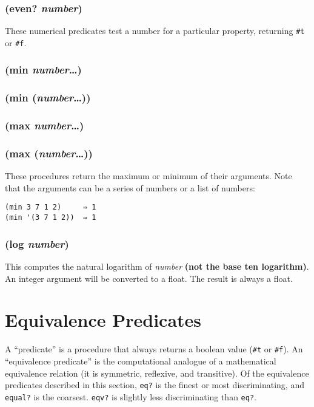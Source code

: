 \documentclass{article}
\begin{document}
\subsubsection{(even? \emph{number})}

These numerical predicates test a number for a particular property, returning \verb|#t| or
\verb|#f|.

\subsubsection{(min \emph{number}\ldots{})}

\subsubsection{(min (\emph{number}\ldots{}))}

\subsubsection{(max \emph{number}\ldots{})}

\subsubsection{(max (\emph{number}\ldots{}))}

These procedures return the maximum or minimum of their arguments. Note that the arguments can
be a series of numbers or a list of numbers:

\begin{verbatim}
(min 3 7 1 2)     ⇒ 1
(min '(3 7 1 2))  ⇒ 1
\end{verbatim}

\subsubsection{(log \emph{number})}

This computes the natural logarithm of \emph{number} \textbf{(not the base ten logarithm)}. An
integer argument will be converted to a float. The result is always a float.

\section{Equivalence Predicates}\label{sec:equivalence-predicates}

A ``predicate'' is a procedure that always returns a boolean value (\verb|#t| or
\verb|#f|). An ``equivalence predicate'' is the computational analogue of a mathematical
equivalence relation (it is symmetric, reflexive, and transitive). Of the equivalence
predicates described in this section, \verb|eq?| is the finest or most discriminating, and
\verb|equal?| is the coarsest. \verb|eqv?| is slightly less discriminating than
\verb|eq?|.
\end{document}
